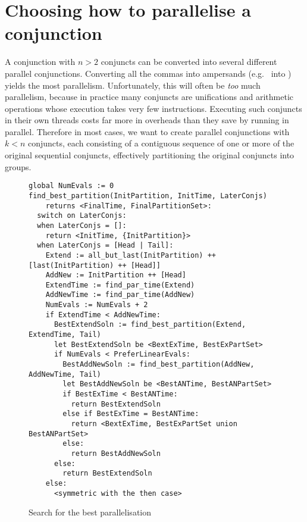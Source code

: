
\section{Choosing how to parallelise a conjunction}
\label{sec:overlap_howto}

A conjunction with $n > 2$ conjuncts
can be converted into several different parallel conjunctions.
Converting all the commas into ampersands
(e.g.\  into )
yields the most parallelism.
Unfortunately, this will often be \emph{too} much parallelism,
because in practice many conjuncts are unifications
and arithmetic operations whose execution takes very few instructions.
Executing such conjuncts in their own threads
costs far more in overheads than they save by running in parallel.
Therefore in most cases,
we want to create parallel conjunctions with $k < n$ conjuncts,
each consisting of a contiguous sequence
of one or more of the original sequential conjuncts,
effectively partitioning the original conjuncts into groups.

\begin{figure}
\begin{center}
\begin{verbatim}
global NumEvals := 0
find_best_partition(InitPartition, InitTime, LaterConjs)
    returns <FinalTime, FinalPartitionSet>:
  switch on LaterConjs:
  when LaterConjs = []:
    return <InitTime, {InitPartition}>
  when LaterConjs = [Head | Tail]:
    Extend := all_but_last(InitPartition) ++ [last(InitPartition) ++ [Head]]
    AddNew := InitPartition ++ [Head]
    ExtendTime := find_par_time(Extend)
    AddNewTime := find_par_time(AddNew)
    NumEvals := NumEvals + 2
    if ExtendTime < AddNewTime:
      BestExtendSoln := find_best_partition(Extend, ExtendTime, Tail)
      let BestExtendSoln be <BextExTime, BestExPartSet>
      if NumEvals < PreferLinearEvals:
        BestAddNewSoln := find_best_partition(AddNew, AddNewTime, Tail)
        let BestAddNewSoln be <BestANTime, BestANPartSet>
        if BestExTime < BestANTime:
          return BestExtendSoln
        else if BestExTime = BestANTime:
          return <BextExTime, BestExPartSet union BestANPartSet>
        else:
          return BestAddNewSoln
      else:
        return BestExtendSoln
    else:
      <symmetric with the then case>
\end{verbatim}
\end{center}
\caption{Search for the best parallelisation}
\label{fig:best_par_search}
\end{figure}

